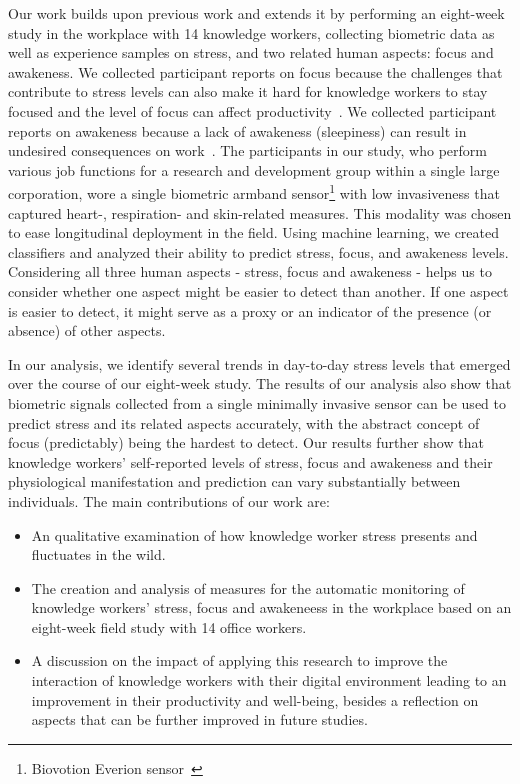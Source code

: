 Our work builds upon previous work and extends it by performing an
eight-week study in the workplace with 14 knowledge workers,
collecting biometric data as well as
experience samples on stress, and two related human aspects: focus and
awakeness. We collected participant reports on focus because the
challenges that contribute to stress levels can also make it hard for
knowledge workers to stay focused and the level of focus
can affect
productivity~\cite{mark2014bored}.  We collected participant reports
on awakeness because a lack of awakeness (sleepiness) can result in
undesired consequences on work~\cite{connor02}.  The participants in
our study, who perform various job functions for a research and
development group within a single large corporation, wore a single
biometric armband sensor\footnote{Biovotion Everion
  sensor~\cite{everion}} with low invasiveness that captured heart-,
respiration- and skin-related measures. This modality was chosen to
ease longitudinal deployment in the field. Using machine learning, we
created classifiers and analyzed their ability to predict stress,
focus, and awakeness levels. Considering all three human aspects - stress,
focus and awakeness - helps us to consider whether one aspect might be easier
 to detect than another. If one aspect is easier to detect, it might serve
as a proxy or an indicator of the presence (or absence) of other aspects. 


In our analysis, we identify several trends in day-to-day stress levels
that emerged over the course of our eight-week study.  The results of
our analysis also show that biometric signals collected from a single
minimally invasive sensor can be used to predict stress and its
related aspects accurately, with the abstract concept of focus
(predictably) being the hardest to detect. Our results further show
that knowledge workers' self-reported levels of stress, focus and
awakeness and their physiological manifestation and prediction can
vary substantially between individuals.
The main contributions of our work are:
\begin{itemize}
	\item An qualitative examination of how knowledge worker stress presents and fluctuates in the wild.
	\item The creation and analysis of measures for the automatic monitoring of knowledge workers' stress, focus and awakeneess in the workplace based on an eight-week field study with 14 office workers.
	\item A discussion on the impact of applying this research to improve
the interaction of knowledge workers with their digital environment leading to an improvement in their productivity and well-being, besides a reflection on aspects that can be further improved in future studies.
    \end{itemize}

